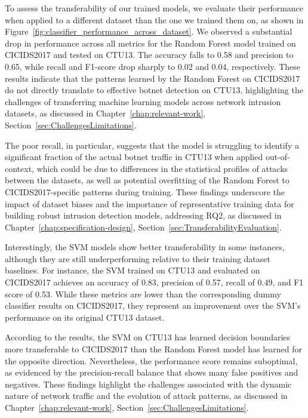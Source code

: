 To assess the transferability of our trained models, we evaluate their performance when applied to a different dataset than the one we trained them on, as shown in Figure~\ref{fig:classifier_performance_across_dataset}. We observed a substantial drop in performance across all metrics for the Random Forest model trained on CICIDS2017 and tested on CTU13. The accuracy falls to 0.58 and precision to 0.65, while recall and F1-score drop sharply to 0.02 and 0.04, respectively. These results indicate that the patterns learned by the Random Forest on CICIDS2017 do not directly translate to effective botnet detection on CTU13, highlighting the challenges of transferring machine learning models across network intrusion datasets, as discussed in Chapter~\ref{chap:relevant-work}, Section~\ref{sec:ChallengesLimitations}.

The poor recall, in particular, suggests that the model is struggling to identify a significant fraction of the actual botnet traffic in CTU13 when applied out-of-context, which could be due to differences in the statistical profiles of attacks between the datasets, as well as potential overfitting of the Random Forest to CICIDS2017-specific patterns during training. These findings underscore the impact of dataset biases and the importance of representative training data for building robust intrusion detection models, addressing RQ2, as discussed in Chapter~\ref{chap:specification-design}, Section~\ref{sec:TransferabilityEvaluation}.

Interestingly, the SVM models show better transferability in some instances, although they are still underperforming relative to their training dataset baselines. For instance, the SVM trained on CTU13 and evaluated on CICIDS2017 achieves an accuracy of 0.83, precision of 0.57, recall of 0.49, and F1 score of 0.53. While these metrics are lower than the corresponding dummy classifier results on CICIDS2017, they represent an improvement over the SVM's performance on its original CTU13 dataset.

According to the results, the SVM on CTU13 has learned decision boundaries more transferable to CICIDS2017 than the Random Forest model has learned for the opposite direction. Nevertheless, the performance score remains suboptimal, as evidenced by the precision-recall balance that shows many false positives and negatives. These findings highlight the challenges associated with the dynamic nature of network traffic and the evolution of attack patterns, as discussed in Chapter~\ref{chap:relevant-work}, Section~\ref{sec:ChallengesLimitations}.

